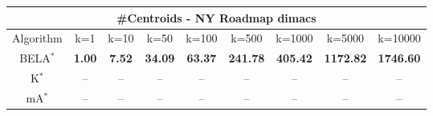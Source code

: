 \begin{tabular}{c|cccccccc}\toprule
\multicolumn{9}{c}{#Centroids - NY Roadmap dimacs}\\ \midrule
Algorithm & k=1 & k=10 & k=50 & k=100 & k=500 & k=1000 & k=5000 & k=10000 \\ \midrule
BELA$^*$ & \textbf{1.00} & \textbf{7.52} & \textbf{34.09} & \textbf{63.37} & \textbf{241.78} & \textbf{405.42} & \textbf{1172.82} & \textbf{1746.60} \\
K$^*$ & -- & -- & -- & -- & -- & -- & -- & -- \\
mA$^*$ & -- & -- & -- & -- & -- & -- & -- & -- \\ \bottomrule 
\end{tabular}
